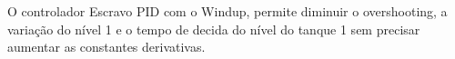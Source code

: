 O controlador Escravo PID com o Windup, permite diminuir o overshooting, a variação do nível 1 e o tempo de decida
do nível do tanque 1 sem precisar aumentar as constantes derivativas.
